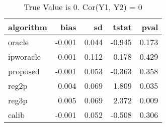 \begin{table}[h!]

\caption{True Value is 0. Cor(Y1, Y2) = 0}
\centering
\begin{tabular}[t]{lrrrr}
\toprule
algorithm & bias & sd & tstat & pval\\
\midrule
oracle & -0.001 & 0.044 & -0.945 & 0.173\\
ipworacle & 0.001 & 0.112 & 0.178 & 0.429\\
proposed & -0.001 & 0.053 & -0.363 & 0.358\\
reg2p & 0.004 & 0.069 & 1.809 & 0.035\\
reg3p & 0.005 & 0.069 & 2.372 & 0.009\\
\addlinespace
calib & -0.001 & 0.052 & -0.508 & 0.306\\
\bottomrule
\end{tabular}
\end{table}
